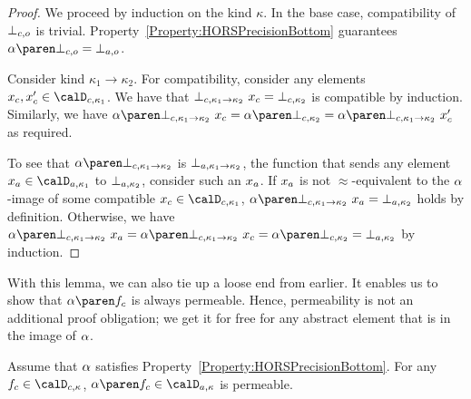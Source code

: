 \documentclass[../../diss.tex]{subfiles}
\begin{document}
\begin{proof}
    We proceed by induction on the kind $\kappa$.
    In the base case, compatibility of $\botc{\ground}$ is trivial.
    Property~\ref{Property:HORSPrecisionBottom} guarantees $\abs{\botc{\ground}} = \bota{\ground}$.

    Consider kind $\kappa_1 \to \kappa_2$.
    For compatibility, consider any elements $\xc, \xc' \in \domainc{\kappa_1}$.
    We have that $\botc{\kappa_1 \to \kappa_2} \appl \xc = \botc{\kappa_2}$ is compatible by induction.
    Similarly, we have $\abs{\botc{\kappa_1 \to \kappa_2} \appl \xc} = \abs{\botc{\kappa_2}} = \abs{\botc{\kappa_1 \to \kappa_2} \appl \xc'}$ as required.

    To see that $\abs{\botc{\kappa_1 \to \kappa_2}}$ is $\bota{\kappa_1 \to \kappa_2}$, the function that sends any element $\xa \in \domaina{\kappa_1}$ to $\bota{\kappa_2}$, consider such an $x_a$.
    If $x_a$ is not $\approx$-equivalent to the $\abs$-image of some compatible $\xc \in \domainc{\kappa_1}$, $\abs{\botc{\kappa_1 \to \kappa_2}} \appl \xa = \bota{\kappa_2}$ holds by definition.
    Otherwise, we have
    \(
        \abs{\botc{\kappa_1 \to \kappa_2}} \appl \xa
        =
        \abs{\botc{\kappa_1 \to \kappa_2} \appl \xc}
        =
        \abs{\botc{\kappa_2}}
        =
        \bota{\kappa_2}
    \)
    by induction.
\end{proof}

With this lemma, we can also tie up a loose end from earlier.
It enables us to show that $\abs{\fc}$ is always permeable.
Hence, permeability is not an additional proof obligation; we get it for free for any abstract element that is in the image of $\abs$.

\begin{lemma}%
\label{Lemma:HORSEFPTAbstractionApproxCompatible}%
    Assume that $\abs$ satisfies Property~\ref{Property:HORSPrecisionBottom}.
    For any $\fc \in \domainc{\kappa}$, $\abs{\fc} \in \domaina{\kappa}$ is permeable.
\end{lemma}
\end{document}
